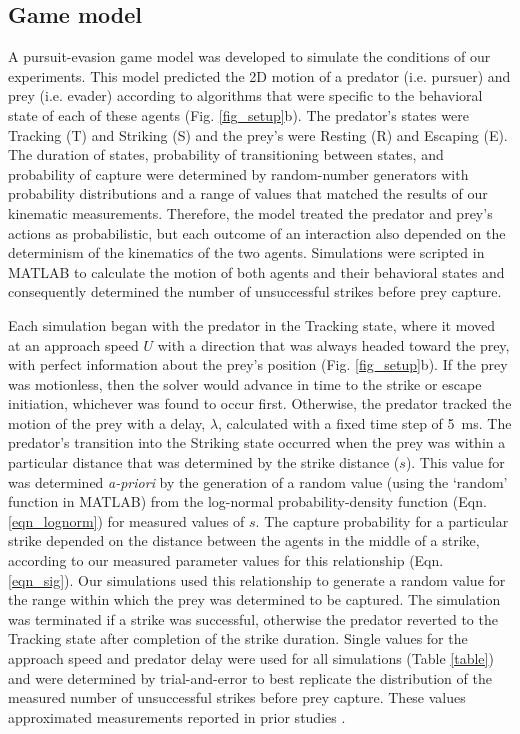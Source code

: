 \documentclass[]{rsos}%
\begin{document}
\subsection{Game model}
A pursuit-evasion game model was developed to simulate the conditions of our experiments. 
This model predicted the 2D motion of a predator (i.e. pursuer) and prey (i.e. evader) according to algorithms that were specific to the behavioral state of each of these agents (Fig. \ref{fig_setup}b). 
The predator's states were Tracking (T) and Striking (S) and the prey's were Resting (R) and Escaping (E). 
The duration of states, probability of transitioning between states, and probability of capture were determined by random-number generators with probability distributions and a range of values that matched the results of our kinematic measurements.
Therefore, the model treated the predator and prey's actions as probabilistic, but each outcome of an interaction also depended on the determinism of the kinematics of the two agents.
Simulations were scripted in MATLAB to calculate the motion of both agents and their behavioral states and consequently determined the number of unsuccessful strikes before prey capture.

Each simulation began with the predator in the Tracking state, where it moved at an approach speed $U$ with a direction that was always headed toward the prey, with perfect information about the prey's position (Fig. \ref{fig_setup}b). 
If the prey was motionless, then the solver would advance in time to the strike or escape initiation, whichever was found to occur first.
Otherwise, the predator tracked the motion of the prey with a delay, $\lambda$, calculated with a fixed time step of \SI{5}{\ms}.  
The predator's transition into the Striking state occurred when the prey was within a particular distance that was determined by the strike distance ($s$). 
This value for was determined \textit{a-priori} by the generation of a random value (using the `random' function in MATLAB) from the log-normal probability-density function (Eqn. \ref{eqn_lognorm}) for measured values of $s$.
The capture probability for a particular strike depended on the distance between the agents in the middle of a strike, according to our measured parameter values for this relationship (Eqn. \ref{eqn_sig}).
Our simulations used this relationship to generate a random value for the range within which the prey was determined to be captured.
The simulation was terminated if a strike was successful, otherwise the predator reverted to the Tracking state after completion of the strike duration.
Single values for the approach speed and predator delay were used for all simulations (Table \ref{table}) and were determined by trial-and-error to best replicate the distribution of the measured number of unsuccessful strikes before prey capture. 
These values approximated measurements reported in prior studies \cite{McHenry:2005tc, Stewart:2013bha}. 
\end{document}
